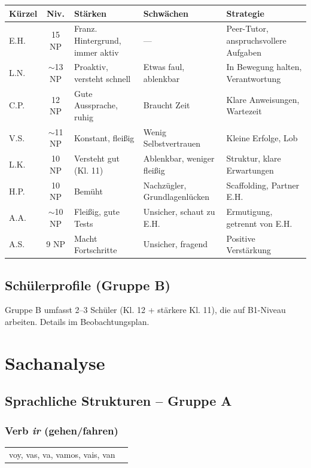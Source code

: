 \documentclass[11pt,a4paper]{article}
\begin{document}
\begin{tabular}{|l|c|p{3cm}|p{3cm}|p{4cm}|}
\hline
\textbf{Kürzel} & \textbf{Niv.} & \textbf{Stärken} & \textbf{Schwächen} & \textbf{Strategie} \\
\hline
E.H. & 15 NP & Franz. Hintergrund, immer aktiv & --- & Peer-Tutor, anspruchsvollere Aufgaben \\
\hline
L.N. & $\sim$13 NP & Proaktiv, versteht schnell & Etwas faul, ablenkbar & In Bewegung halten, Verantwortung \\
\hline
C.P. & 12 NP & Gute Aussprache, ruhig & Braucht Zeit & Klare Anweisungen, Wartezeit \\
\hline
V.S. & $\sim$11 NP & Konstant, fleißig & Wenig Selbstvertrauen & Kleine Erfolge, Lob \\
\hline
L.K. & 10 NP & Versteht gut (Kl. 11) & Ablenkbar, weniger fleißig & Struktur, klare Erwartungen \\
\hline
H.P. & 10 NP & Bemüht & Nachzügler, Grundlagenlücken & Scaffolding, Partner E.H. \\
\hline
A.A. & $\sim$10 NP & Fleißig, gute Tests & Unsicher, schaut zu E.H. & Ermutigung, getrennt von E.H. \\
\hline
A.S. & 9 NP & Macht Fortschritte & Unsicher, fragend & Positive Verstärkung \\
\hline
\end{tabular}

\subsection{Schülerprofile (Gruppe B)}

Gruppe B umfasst 2--3 Schüler (Kl. 12 + stärkere Kl. 11), die auf B1-Niveau arbeiten. Details im Beobachtungsplan.

\section{Sachanalyse}

\subsection{Sprachliche Strukturen -- Gruppe A}

\subsubsection{Verb \textit{ir} (gehen/fahren)}
\begin{tabular}{ll}
    voy, vas, va, vamos, vais, van \\
\end{tabular}
\end{document}
